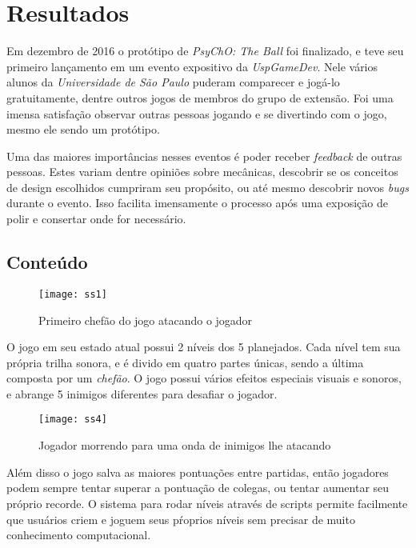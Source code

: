 \chapter{Resultados}
\label{cap:resultados}

Em dezembro de 2016 o protótipo de \textit{PsyChO: The Ball} foi finalizado, e teve seu primeiro lançamento em um evento expositivo da \textit{UspGameDev}. Nele vários alunos da \textit{Universidade de São Paulo} puderam comparecer e jogá-lo gratuitamente, dentre outros jogos de membros do grupo de extensão. Foi uma imensa satisfação observar outras pessoas jogando e se divertindo com o jogo, mesmo ele sendo um protótipo.

Uma das maiores importâncias nesses eventos é poder receber \textit{feedback} de outras pessoas. Estes variam dentre opiniões sobre mecânicas, descobrir se os conceitos de design escolhidos cumpriram seu propósito, ou até mesmo descobrir novos \textit{bugs} durante o evento. Isso facilita imensamente o processo após uma exposição de polir e consertar onde for necessário.

\section{Conteúdo}
\label{sec:conteudo}

\begin{figure}[h!]
\texttt{[image: ss1]}
\centering
\caption{Primeiro chefão do jogo atacando o jogador}
\end{figure}

O jogo em seu estado atual possui 2 níveis dos 5 planejados. Cada nível tem sua própria trilha sonora, e é divido em quatro partes únicas, sendo a última composta por um \textit{chefão}. O jogo possui vários efeitos especiais visuais e sonoros, e abrange 5 inimigos diferentes para desafiar o jogador.

\begin{figure}[h!]
\texttt{[image: ss4]}
\centering
\caption{Jogador morrendo para uma onda de inimigos lhe atacando}
\end{figure}

Além disso o jogo salva as maiores pontuações entre partidas, então jogadores podem sempre tentar superar a pontuação de colegas, ou tentar aumentar seu próprio recorde.
O sistema para rodar níveis através de scripts permite facilmente que usuários criem e joguem seus pŕoprios níveis sem precisar de muito conhecimento computacional.

